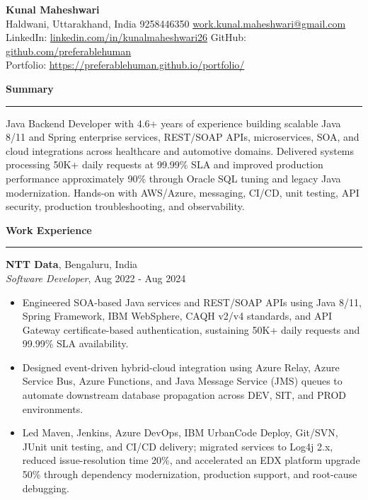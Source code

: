 \documentclass[10pt,letterpaper]{article}
\newcommand{\ressection}[1]{%
  \vspace{4pt}\par\textbf{#1}\par\vspace{1.5pt}\hrule\vspace{2.5pt}
}
\begin{document}
\pagestyle{empty}
\raggedright
\fontsize{10.35}{11.35}\selectfont

{\Large \textbf{Kunal Maheshwari}}\\
Haldwani, Uttarakhand, India \textbar{} 9258446350 \textbar{} \href{mailto:work.kunal.maheshwari@gmail.com} {work.kunal.maheshwari@gmail.com}\\
LinkedIn: \href{https://www.linkedin.com/in/kunalmaheshwari26}{linkedin.com/in/kunalmaheshwari26} \textbar{} GitHub: \href{https://github.com/preferablehuman}{github.com/preferablehuman}\\
Portfolio: \href{https://preferablehuman.github.io/portfolio/}{https://preferablehuman.github.io/portfolio/}
\ressection{Summary}
Java Backend Developer with 4.6+ years of experience building scalable Java 8/11 and Spring enterprise services, REST/SOAP APIs, microservices, SOA, and cloud integrations across healthcare and automotive domains. Delivered systems processing 50K+ daily requests at 99.99\% SLA and improved production performance approximately 90\% through Oracle SQL tuning and legacy Java modernization. Hands-on with AWS/Azure, messaging, CI/CD, unit testing, API security, production troubleshooting, and observability.

\ressection{Work Experience}

\textbf{NTT Data}, Bengaluru, India\\
\textit{Software Developer}, Aug 2022 - Aug 2024
\begin{itemize}
  \item Engineered SOA-based Java services and REST/SOAP APIs using Java 8/11, Spring Framework, IBM WebSphere, CAQH v2/v4 standards, and API Gateway certificate-based authentication, sustaining 50K+ daily requests and 99.99\% SLA availability.
  \item Designed event-driven hybrid-cloud integration using Azure Relay, Azure Service Bus, Azure Functions, and Java Message Service (JMS) queues to automate downstream database propagation across DEV, SIT, and PROD environments.
  \item Led Maven, Jenkins, Azure DevOps, IBM UrbanCode Deploy, Git/SVN, JUnit unit testing, and CI/CD delivery; migrated services to Log4j 2.x, reduced issue-resolution time 20\%, and accelerated an EDX platform upgrade 50\% through dependency modernization, production support, and root-cause debugging.
\end{itemize}
\end{document}
